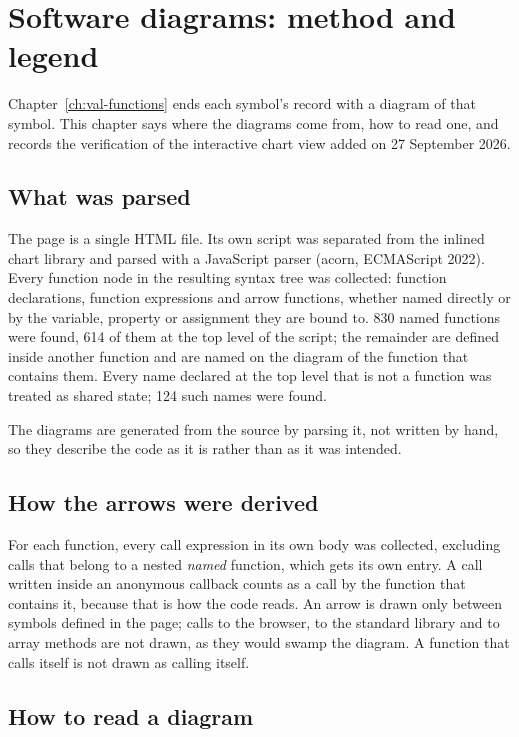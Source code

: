 \chapter{Software diagrams: method and legend}\label{ch:val-diagrams}

Chapter~\ref{ch:val-functions} ends each symbol's record with a diagram of that symbol. This chapter
says where the diagrams come from, how to read one, and records the verification of the interactive
chart view added on 27 September 2026.

\section{What was parsed}

The page is a single HTML file. Its own script was separated from the inlined chart library and
parsed with a JavaScript parser (acorn, ECMAScript 2022). Every function node in the resulting
syntax tree was collected: function declarations, function expressions and arrow functions, whether
named directly or by the variable, property or assignment they are bound to. 830 named functions
were found, 614 of them at the top level of the script; the remainder are defined inside another
function and are named on the diagram of the function that contains them. Every name declared at the
top level that is not a function was treated as shared state; 124 such names were found.

The diagrams are generated from the source by parsing it, not written by hand, so they describe the
code as it is rather than as it was intended.

\section{How the arrows were derived}

For each function, every call expression in its own body was collected, excluding calls that belong
to a nested \emph{named} function, which gets its own entry. A call written inside an anonymous
callback counts as a call by the function that contains it, because that is how the code reads. An
arrow is drawn only between symbols defined in the page; calls to the browser, to the standard
library and to array methods are not drawn, as they would swamp the diagram. A function that calls
itself is not drawn as calling itself.

\section{How to read a diagram}


